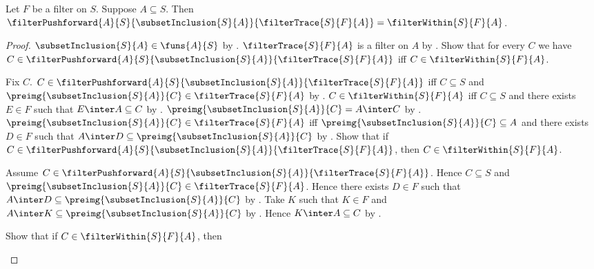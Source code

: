 \begin{theorem}\label{filter_trace_pushforward_eq_within}
    Let $F$ be a filter on $S$.
    Suppose $A\subseteq S$.
    Then $\filterPushforward{A}{S}{\subsetInclusion{S}{A}}{
        \filterTrace{S}{F}{A}}=\filterWithin{S}{F}{A}$.
\end{theorem}
\begin{proof}
    $\subsetInclusion{S}{A}\in\funs{A}{S}$ by
        .
    $\filterTrace{S}{F}{A}$ is a filter on $A$ by
        .
    Show that for every $C$ we have
        $C\in\filterPushforward{A}{S}{\subsetInclusion{S}{A}}{
            \filterTrace{S}{F}{A}}$ iff
        $C\in\filterWithin{S}{F}{A}$.
    \begin{subproof}
        Fix $C$.
        $C\in\filterPushforward{A}{S}{\subsetInclusion{S}{A}}{
            \filterTrace{S}{F}{A}}$ iff
            $C\subseteq S$ and
            $\preimg{\subsetInclusion{S}{A}}{C}
                \in\filterTrace{S}{F}{A}$ by
            .
        $C\in\filterWithin{S}{F}{A}$ iff
            $C\subseteq S$ and there exists $E\in F$ such that
            $E\inter A\subseteq C$ by .
        $\preimg{\subsetInclusion{S}{A}}{C}=A\inter C$ by
            .
        $\preimg{\subsetInclusion{S}{A}}{C}
            \in\filterTrace{S}{F}{A}$ iff
            $\preimg{\subsetInclusion{S}{A}}{C}\subseteq A$ and
            there exists $D\in F$ such that
            $A\inter D\subseteq\preimg{\subsetInclusion{S}{A}}{C}$ by
            .
        Show that if
            $C\in\filterPushforward{A}{S}{\subsetInclusion{S}{A}}{
                \filterTrace{S}{F}{A}}$, then
            $C\in\filterWithin{S}{F}{A}$.
        \begin{subproof}
            Assume $C\in\filterPushforward{A}{S}{
                \subsetInclusion{S}{A}}{\filterTrace{S}{F}{A}}$.
            Hence $C\subseteq S$ and
                $\preimg{\subsetInclusion{S}{A}}{C}
                    \in\filterTrace{S}{F}{A}$.
            Hence there exists $D\in F$ such that
                $A\inter D\subseteq
                    \preimg{\subsetInclusion{S}{A}}{C}$ by
                \auto.
            Take $K$ such that $K\in F$ and $A\inter K\subseteq
                \preimg{\subsetInclusion{S}{A}}{C}$ by \auto.
            Hence $K\inter A\subseteq C$ by
                .
        \end{subproof}
        Show that if $C\in\filterWithin{S}{F}{A}$, then

\end{subproof}
\end{proof}
